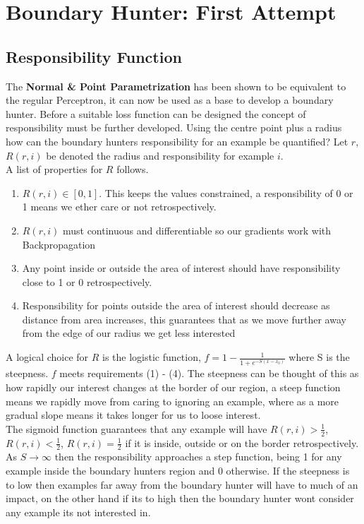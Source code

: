 \documentclass[notitlepage]{report}
\theoremstyle{definition}
\begin{document}
\chapter{Boundary Hunter: First Attempt}
\section{Responsibility Function}
The \textbf{Normal \& Point Parametrization} has been shown to be equivalent to the regular Perceptron, it can now be used as a base to develop a boundary hunter. Before a suitable loss function can be designed the concept of responsibility must be further developed. Using the centre point plus a radius how can the boundary hunters responsibility for an example be quantified? Let $r$, $R(r, i)$ be denoted the radius and responsibility for example $i$.\\

A list of properties for $R$ follows.

\begin{enumerate}
	\item $R(r, i) \in [0, 1]$. This keeps the values constrained, a responsibility of 0 or 1 means we ether care or not retrospectively.
	\item $R(r, i)$ must continuous and differentiable so our gradients work with Backpropagation
	\item Any point inside or outside the area of interest should have responsibility close to 1 or 0 retrospectively.
	\item Responsibility for points outside the area of interest should decrease as distance from area increases, this guarantees that as we move further away from the edge of our radius we get less interested
\end{enumerate}

A logical choice for $R$ is the logistic function, $f = 1 - \frac{1}{1 + e^{-S(x - x_0)}}$ where S is the steepness. $f$ meets requirements (1) - (4). The steepness can be thought of this as how rapidly our interest changes at the border of our region, a steep function means we rapidly move from caring to ignoring an example, where as a more gradual slope means it takes longer for us to loose interest.\\

The sigmoid function guarantees that any example will have $R(r, i) > \frac{1}{2}$, $R(r, i) < \frac{1}{2}$, $R(r, i) = \frac{1}{2}$ if it is inside, outside or on the border retrospectively. As $S \rightarrow \infty$ then the responsibility approaches a step function, being 1 for any example inside the boundary hunters region and 0 otherwise. If the steepness is to low then examples far away from the boundary hunter will have to much of an impact, on the other hand if its to high then the boundary hunter wont consider any example its not interested in. 
\end{document}
